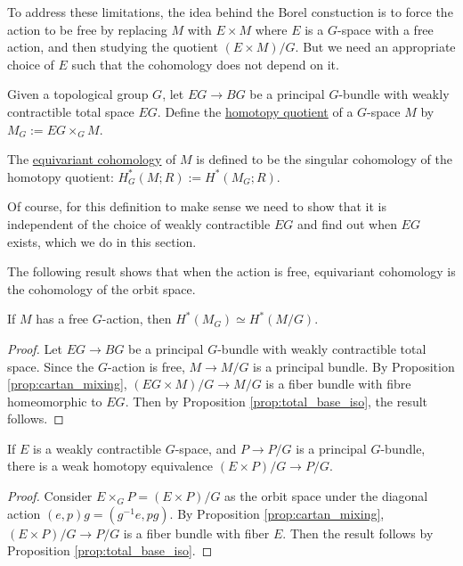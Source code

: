 To address these limitations, the idea behind the Borel constuction is to force 
the action to be free by replacing  $M$ with  $E\times M$ where $E$ is a  
$G$-space with a free action, and then studying the quotient  $(E\times M) /G$. 
But we need an appropriate choice of $E$ such that the cohomology does not 
depend on it.

\begin{defn}
	Given a topological group $G$, let  $EG \to BG$ be a principal  $G$-bundle
	with weakly contractible total space  $EG$. Define the  \underline{homotopy
	quotient} of a $G$-space $M$ by $M_G:=EG\times_G M$.
	 
	The \underline{equivariant cohomology} of $M$ is defined to be the singular
	cohomology of the homotopy quotient: $H_G^*(M;R) := H^*(M_G;R)$.
\end{defn}
Of course, for this definition to make sense we need to show that it is
independent of the choice of weakly contractible $EG$ and find out when $EG$ 
exists, which we do in this section. 

The following result shows that when the action is free, equivariant cohomology
is the cohomology of the orbit space.
\begin{prop}
	If $M$ has a free  $G$-action, then $H^*(M_G)\simeq H^*(M /G)$. 
\end{prop}
\begin{proof}
	Let $EG \to BG$ be a principal  $G$-bundle with weakly contractible total
	space. Since the $G$-action is free,  $M \to M /G$ is a principal bundle.
	By Proposition \ref{prop:cartan_mixing}, 
	$(EG\times M) /G \to M /G$ is a fiber bundle with
	fibre homeomorphic to $EG$. Then by Proposition \ref{prop:total_base_iso},
	the result follows.
\end{proof}

\begin{lem} %
	If $E$ is a weakly contractible $G$-space, and $P\to P/G$ is a principal
	$G$-bundle, there is a weak homotopy equivalence $(E\times P) /G \to P /G$.  
\end{lem}
\begin{proof}
	Consider $E\times_G P = (E\times P) /G$ as the orbit space under 
	the diagonal action $(e,p)g = (g^{-1}e,pg)$. 
	By Proposition \ref{prop:cartan_mixing}, $(E\times P) /G \to P /G$ is a
	fiber bundle with fiber $E$. Then the result follows by Proposition
	\ref{prop:total_base_iso}.
\end{proof}

